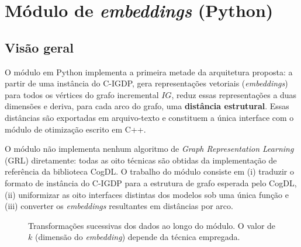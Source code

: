 \documentclass[12pt,a4paper]{article}
\begin{document}
\section{Módulo de \textit{embeddings} (Python)}
\label{sec:modulo-embeddings}

\subsection{Visão geral}

O módulo em Python implementa a primeira metade da arquitetura proposta:
a partir de uma instância do C-IGDP, gera representações vetoriais
(\textit{embeddings}) para todos os vértices do grafo incremental $IG$,
reduz essas representações a duas dimensões e deriva, para cada arco do
grafo, uma \textbf{distância estrutural}. Essas distâncias são exportadas
em arquivo-texto e constituem a única interface com o módulo de
otimização escrito em C++.

O módulo não implementa nenhum algoritmo de \textit{Graph Representation
Learning} (GRL) diretamente: todas as oito técnicas são obtidas da
implementação de referência da biblioteca CogDL.
O trabalho
do módulo consiste em (i) traduzir o formato de instância do C-IGDP para
a estrutura de grafo esperada pelo CogDL, (ii) uniformizar as oito
interfaces distintas dos modelos sob uma única função e (iii) converter
os \textit{embeddings} resultantes em distâncias por arco.

\begin{figure}[htbp]
\centering
{}
\caption{Transformações sucessivas dos dados ao longo do módulo. O valor
de $k$ (dimensão do \textit{embedding}) depende da técnica empregada.}
\label{fig:pipeline-dados}
\end{figure}
\end{document}
